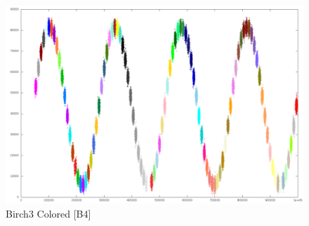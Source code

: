 \documentclass[10pt,utf8]{beamer}
\begin{document}
\begin{frame}
	\hspace{-16pt}
	\begin{figure}
		\centering
		\vspace{-31pt}
		\includegraphics[scale=0.25, keepaspectratio]{../output/pics/sine.png} 
		\vspace{-14pt}
		\caption{Birch3 Colored [B4]}
	\end{figure}
\end{frame}
\end{document}
